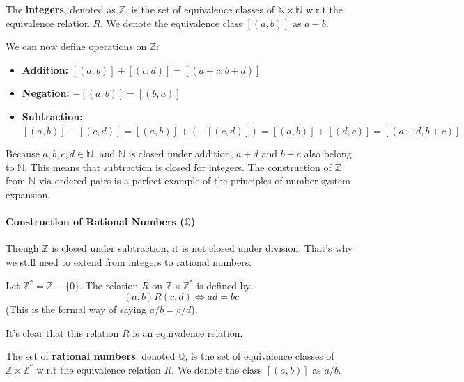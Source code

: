 \begin{definition}
The \textbf{integers}, denoted as $\mathbb{Z}$, is the set of equivalence classes of $\mathbb{N} \times \mathbb{N}$ w.r.t the equivalence relation $R$. We denote the equivalence class $[(a,b)]$ as $a-b$.
\end{definition}

We can now define operations on $\mathbb{Z}$:
\begin{definition}
\begin{itemize}
    \item \textbf{Addition:} $[(a,b)] + [(c,d)] = [(a+c, b+d)]$
    \item \textbf{Negation:} $-[(a,b)] = [(b,a)]$
    \item \textbf{Subtraction:} $[(a,b)] - [(c,d)] = [(a,b)] + (-[(c,d)]) = [(a,b)] + [(d,c)] = [(a+d, b+c)]$
\end{itemize}
\end{definition}
Because $a,b,c,d \in \mathbb{N}$, and $\mathbb{N}$ is closed under addition, $a+d$ and $b+c$ also belong to $\mathbb{N}$. This means that subtraction is closed for integers. The construction of $\mathbb{Z}$ from $\mathbb{N}$ via ordered pairs is a perfect example of the principles of number system expansion.

\paragraph{Construction of Rational Numbers ($\mathbb{Q}$)}
Though $\mathbb{Z}$ is closed under subtraction, it is not closed under division. That’s why we still need to extend from integers to rational numbers.

\begin{definition}
Let $\mathbb{Z}^* = \mathbb{Z} - \{0\}$. The relation $R$ on $\mathbb{Z} \times \mathbb{Z}^*$ is defined by:
$$ (a,b) R (c,d) \iff ad = bc $$
(This is the formal way of saying $a/b = c/d$).
\end{definition}
It’s clear that this relation $R$ is an equivalence relation.

\begin{definition}
The set of \textbf{rational numbers}, denoted $\mathbb{Q}$, is the set of equivalence classes of $\mathbb{Z} \times \mathbb{Z}^*$ w.r.t the equivalence relation $R$. We denote the class $[(a,b)]$ as $a/b$.
\end{definition}


